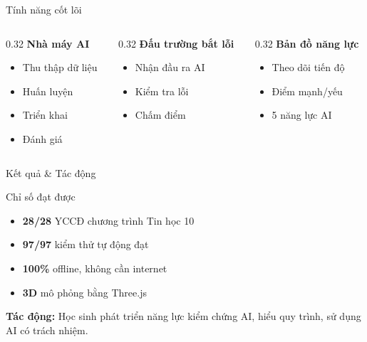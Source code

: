 \documentclass[10pt,xcolor=dvipsnames]{beamer}
\begin{document}
\begin{frame}{Tính năng cốt lõi}
  \begin{columns}[T]
    \begin{column}{0.32\textwidth}
      \textbf{Nhà máy AI}
      \begin{itemize}
        \item Thu thập dữ liệu
        \item Huấn luyện
        \item Triển khai
        \item Đánh giá
      \end{itemize}
    \end{column}
    
    \begin{column}{0.32\textwidth}
      \textbf{Đấu trường bắt lỗi}
      \begin{itemize}
        \item Nhận đầu ra AI
        \item Kiểm tra lỗi
        \item Chấm điểm
      \end{itemize}
    \end{column}
    
    \begin{column}{0.32\textwidth}
      \textbf{Bản đồ năng lực}
      \begin{itemize}
        \item Theo dõi tiến độ
        \item Điểm mạnh/yếu
        \item 5 năng lực AI
      \end{itemize}
    \end{column}
  \end{columns}
\end{frame}

\begin{frame}{Kết quả \& Tác động}
  \begin{block}{Chỉ số đạt được}
    \begin{itemize}
      \item \textbf{28/28} YCCĐ chương trình Tin học 10
      \item \textbf{97/97} kiểm thử tự động đạt
      \item \textbf{100\%} offline, không cần internet
      \item \textbf{3D} mô phỏng bằng Three.js
    \end{itemize}
  \end{block}
  
  \vspace{0.5em}
  \textbf{Tác động:} Học sinh phát triển năng lực kiểm chứng AI, hiểu quy trình, sử dụng AI có trách nhiệm.
\end{frame}
\end{document}
